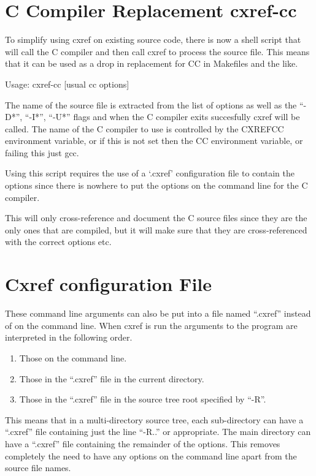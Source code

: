 \section{C Compiler Replacement cxref-cc}

To simplify using cxref on existing source code, there is now a shell script
that will call the C compiler and then call cxref to process the source file.
This means that it can be used as a drop in replacement for CC in Makefiles and
the like.

Usage: cxref-cc [usual cc options]

The name of the source file is extracted from the list of options as well as the
``-D*'', ``-I*'', ``-U*'' flags and when the C compiler exits succesfully cxref will
be called.  The name of the C compiler to use is controlled by the CXREFCC
environment variable, or if this is not set then the CC environment variable, or
failing this just gcc.

Using this script requires the use of a `.cxref' configuration file to contain
the options since there is nowhere to put the options on the command line for
the C compiler.

This will only cross-reference and document the C source files since they are
the only ones that are compiled, but it will make sure that they are
cross-referenced with the correct options etc.

\section{Cxref configuration File}

These command line arguments can also be put into a file named ``.cxref'' instead of
on the command line.  When cxref is run the arguments to the program are
interpreted in the following order.

\begin{enumerate}
\item Those on the command line.
\item Those in the ``.cxref'' file in the current directory.
\item Those in the ``.cxref'' file in the source tree root specified by ``-R''.
\end{enumerate}

This means that in a multi-directory source tree, each sub-directory can have a
``.cxref'' file containing just the line ``-R..'' or appropriate.  The main
directory can have a ``.cxref'' file containing the remainder of the options.  This
removes completely the need to have any options on the command line apart from
the source file names.

